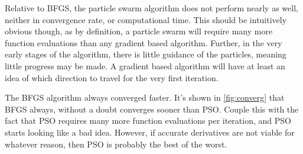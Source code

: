 \documentclass[12pt,parskip=full]{article}
\numberwithin{subsection}{section}
\begin{document}
		Relative to BFGS, the particle swarm algorithm does not perform nearly as well, neither in convergence rate,
		or computational time. This should be intuitively obvious though, as by definition, a particle swarm will
		require many more function evaluations than any gradient based algorithm. Further, in the very early stages of
		the algorithm, there is little guidance of the particles, meaning little progress may be made. A gradient based
		algorithm will have at least an idea of which direction to travel for the very first iteration.
		
		The BFGS algorithm always converged faster. It's shown in \cref{fig:converg} that BFGS always, without a doubt
		converges sooner than PSO. Couple this with the fact that PSO requires many more function evaluations per
		iteration, and PSO starts looking like a bad idea. However, if accurate derivatives are not viable for whatever
		reason, then PSO is probably the best of the worst.
\end{document}
